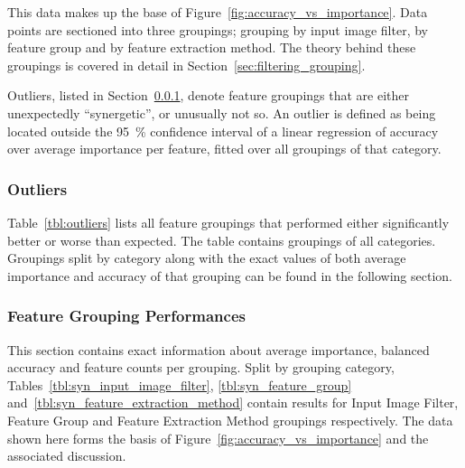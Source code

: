 This data makes up the base of Figure~\ref{fig:accuracy_vs_importance}. Data points are
sectioned into three groupings; grouping by input image filter, by feature group
and by feature extraction method.
The theory behind these groupings is covered in detail in Section~\ref{sec:filtering_grouping}.

Outliers, listed in Section~\ref{sec:appendix_outliers}, denote feature 
groupings that are either unexpectedly \enquote{synergetic}, or unusually not 
so. An outlier is defined as being located outside the \SI{95}{\percent} 
confidence interval of a linear regression of accuracy over average importance 
per feature, fitted over all groupings of that category.

\subsubsection{Outliers}\label{sec:appendix_outliers}

Table~\ref{tbl:outliers} lists all feature groupings that performed either 
significantly better or worse than expected. The table contains groupings of 
all categories. Groupings split by category along with the exact values of 
both average importance and accuracy of that grouping can be found in the 
following section.



\subsubsection{Feature Grouping Performances}

This section contains exact information about average importance, balanced 
accuracy and feature counts per grouping. Split by grouping category, 
Tables~\ref{tbl:syn_input_image_filter}, \ref{tbl:syn_feature_group}
and~\ref{tbl:syn_feature_extraction_method} contain results for Input Image 
Filter, Feature Group and Feature Extraction Method groupings respectively.
The data shown here forms the basis of Figure~\ref{fig:accuracy_vs_importance}
and the associated discussion.

